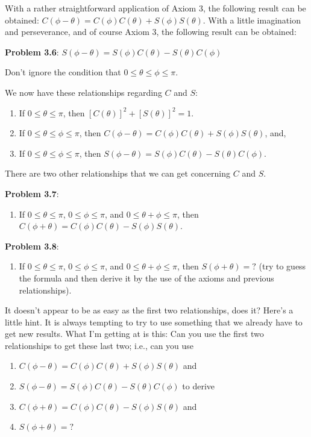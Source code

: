 \documentclass[english]{book}
\begin{document}
With a rather straightforward application of Axiom 3, the following result can be obtained: $C(\phi-\theta) = C(\phi) C(\theta) + S(\phi) S(\theta)$. With a little imagination and perseverance, and of course Axiom 3, the following result can be obtained:

\vspace{0.3cm}

\textbf{Problem 3.6}: $S(\phi-\theta) = S(\phi) C(\theta) - S(\theta) C(\phi)$

Don't ignore the condition that $0 \leq \theta \leq \phi \leq \pi$.

We now have these relationships regarding $C$ and $S$:
\begin{enumerate}[\hspace{1cm}1)]
  \item If $0 \leq \theta \leq \pi$, then $[C(\theta)]^{2} + [S(\theta)]^{2} = 1$.
  \item If $0 \leq \theta \leq \phi \leq \pi$, then $C(\phi-\theta) = C(\phi) C(\theta) + S(\phi) S(\theta)$, and,
  \item If $0 \leq \theta \leq \phi \leq \pi$, then $S(\phi-\theta) = S(\phi) C(\theta) - S(\theta) C(\phi)$.
\end{enumerate}

There are two other relationships that we can get concerning $C$ and $S$.

\vspace{0.3cm}

\textbf{Problem 3.7}:
\begin{enumerate}
  \item[\hspace{1cm}4)] If $0 \leq \theta \leq \pi$, $0 \leq \phi \leq \pi$, and $0 \leq \theta + \phi \leq \pi$, then $C(\phi + \theta) = C(\phi) C(\theta) - S(\phi) S(\theta)$.
\end{enumerate}

\textbf{Problem 3.8}:
\begin{enumerate}
  \item[\hspace{1cm}5)] If $0 \leq \theta \leq \pi$, $0 \leq \phi \leq \pi$, and $0 \leq \theta+\phi \leq \pi$, then $S(\phi + \theta) = ?$ (try to guess the formula and then derive it by the use of the axioms and previous relationships).
\end{enumerate}

It doesn't appear to be as easy as the first two relationships, does it? Here's a little hint. It is always tempting to try to use something that we already have to get new results. What I'm getting at is this: Can you use the first two relationships to get these last two; i.e., can you use
\begin{enumerate}[\hspace{1cm}1)]
  \item $C(\phi-\theta) = C(\phi) C(\theta) + S(\phi) S(\theta)$ and
  \item $S(\phi-\theta) = S(\phi) C(\theta) - S(\theta) C(\phi)$ to derive
  \item $C(\phi+\theta) = C(\phi) C(\theta) - S(\phi) S(\theta)$ and
  \item $S(\phi+\theta) = ?$
\end{enumerate}
\end{document}
